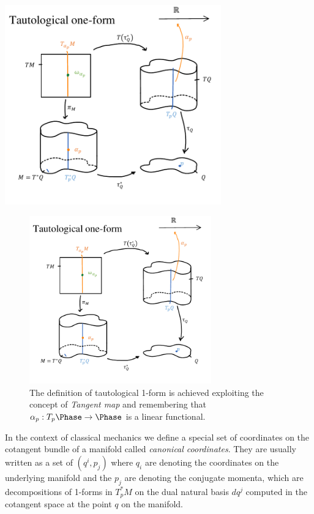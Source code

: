 \documentclass[Main]{subfiles}
\begin{document}
\ifToninus
					\begin{mdframed}
					  	\centering	
   						\includegraphics[width=0.7\textwidth]{Pictures/Tautological1Form} 
					\end{mdframed}
\else
					\begin{figure}[h!]
					  	\centering	
   						\includegraphics[width=0.7\textwidth]{Pictures/Tautological1Form} 
 						\caption{The definition of tautological 1-form is achieved exploiting the concept of \emph{Tangent map} and remembering that $\alpha_p: T_p \Phase \rightarrow \Phase$ is a linear functional.} 				
					\end{figure}
\fi

						In the context of classical mechanics we define a  special set of coordinates on the cotangent bundle of a manifold called \emph{canonical coordinates}.
						They are usually written as a set of $(q^i,p_j)$ where ${q_i}$ are denoting the coordinates on the underlying manifold and the ${p_j}$ are denoting the conjugate momenta, which are decompositions of 1-forms in $T_p^*M$ on the dual natural basis $d q^j$ computed in the cotangent space at the point $q$ on the manifold.
	
\end{document}
